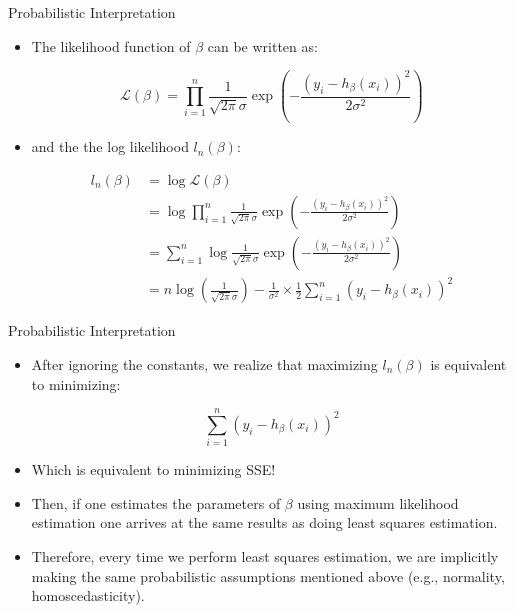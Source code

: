 \documentclass[handout]{beamer}
\begin{document}
\begin{frame}{Probabilistic Interpretation}
\scriptsize{
\begin{itemize}



 \item The likelihood function of $\beta$ can be written as:
 
 \begin{displaymath}
  \mathcal{L}(\beta) = \prod_{i=1}^{n}\frac{1}{\sqrt{2\pi} \sigma} \exp \left(- \frac{(y_i - h_{\beta}(x_{i}) )^{2}}{2\sigma^2}\right)
 \end{displaymath}

 \item and the the log likelihood $l_n(\beta)$:
 
   \begin{align}
l_n(\beta)  & =  \log  \mathcal{L}(\beta) \\
 & = \log \prod_{i=1}^{n}\frac{1}{\sqrt{2\pi} \sigma} \exp \left(- \frac{(y_i - h_{\beta}(x_{i}) )^{2}}{2\sigma^2}\right) \\
  & = \sum_{i=1}^n  \log \frac{1}{\sqrt{2\pi} \sigma} \exp \left(- \frac{(y_i - h_{\beta}(x_{i}) )^{2}}{2\sigma^2}\right) \\
    & = n \log\left(\frac{1}{\sqrt{2\pi} \sigma}\right) - \frac{1}{\sigma^2}\times \frac{1}{2}\sum_{i=1}^n(y_i - h_{\beta}(x_{i}) )^{2}  
 \end{align}
 

\end{itemize}


}
 
\end{frame}


\begin{frame}{Probabilistic Interpretation}
\scriptsize{
\begin{itemize}



 \item After ignoring the constants, we realize that maximizing $l_n(\beta)$ is equivalent to minimizing:
 
 \begin{displaymath}
\sum_{i=1}^n(y_i - h_{\beta}(x_{i}))^{2}
 \end{displaymath}

 \item Which is equivalent to minimizing SSE!
 
 \item  Then, if one estimates the parameters of $\beta$ using maximum likelihood estimation one arrives at the same results as doing least squares estimation.
 \item Therefore, every time we perform least squares estimation, we are implicitly making the same probabilistic assumptions mentioned above (e.g., normality, homoscedasticity).

\end{itemize}


}
 
\end{frame}
\end{document}
